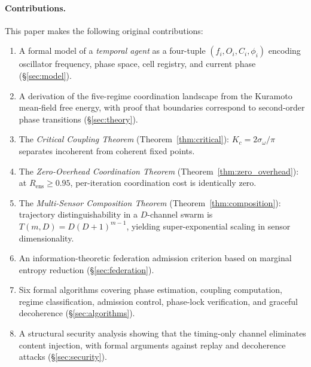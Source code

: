 \documentclass[twocolumn,10pt]{article}
\newcommand{\Rens}{R_{\mathrm{ens}}}
\newcommand{\Kc}{K_c}
\newcommand{\sigmaomega}{\sigma_{\omega}}
\begin{document}
\paragraph{Contributions.}
This paper makes the following original contributions:

\begin{enumerate}[leftmargin=*, label=\textbf{C\arabic*.}]
\item A formal model of a \emph{temporal agent} as a four-tuple
      $(f_i, O_i, C_i, \phi_i)$ encoding oscillator frequency, phase space,
      cell registry, and current phase (\S\ref{sec:model}).

\item A derivation of the five-regime coordination landscape from the
      Kuramoto mean-field free energy, with proof that boundaries correspond
      to second-order phase transitions (\S\ref{sec:theory}).

\item The \emph{Critical Coupling Theorem} (Theorem~\ref{thm:critical}):
      $\Kc = 2\sigmaomega/\pi$ separates incoherent from coherent fixed points.

\item The \emph{Zero-Overhead Coordination Theorem}
      (Theorem~\ref{thm:zero_overhead}): at $\Rens \geq 0.95$, per-iteration
      coordination cost is identically zero.

\item The \emph{Multi-Sensor Composition Theorem}
      (Theorem~\ref{thm:composition}): trajectory distinguishability in a
      $D$-channel swarm is $T(m,D)=D(D+1)^{m-1}$, yielding super-exponential
      scaling in sensor dimensionality.

\item An information-theoretic federation admission criterion based on
      marginal entropy reduction (\S\ref{sec:federation}).

\item Six formal algorithms covering phase estimation, coupling computation,
      regime classification, admission control, phase-lock verification, and
      graceful decoherence (\S\ref{sec:algorithms}).

\item A structural security analysis showing that the timing-only channel
      eliminates content injection, with formal arguments against replay and
      decoherence attacks (\S\ref{sec:security}).
\end{enumerate}
\end{document}
